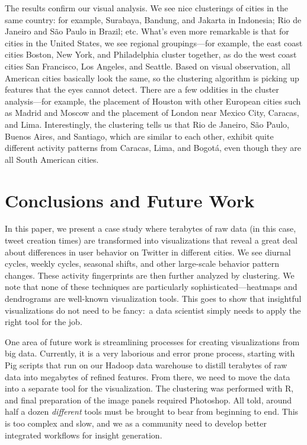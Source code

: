\documentclass[letterpaper]{article}
\begin{document}
The results confirm our visual analysis. We see nice clusterings of
cities in the same country: for example, Surabaya, Bandung, and
Jakarta in Indonesia; Rio de Janeiro and S\~{a}o Paulo in Brazil;
etc. What's even more remarkable is that for cities in the United
States, we see regional groupings---for example, the east coast cities
Boston, New York, and Philadelphia cluster together, as do the west
coast cities San Francisco, Los Angeles, and Seattle. Based on visual
observation, all American cities basically look the same, so the
clustering algorithm is picking up features that the eyes cannot detect.
There are a few oddities in the cluster analysis---for example, the
placement of Houston with other European cities such as Madrid and Moscow and the placement of
London near Mexico City, Caracas, and Lima. 
Interestingly, the clustering tells us that
Rio de Janeiro, S\~{a}o Paulo, Buenos Aires, and Santiago, which
are similar to each other, exhibit quite different activity patterns
from Caracas, Lima, and Bogot\'{a}, even though they are all South American cities.

\section{Conclusions and Future Work}

In this paper, we present a case study where terabytes of raw data (in
this case, tweet creation times) are transformed into visualizations
that reveal a great deal about differences in user behavior on Twitter
in different cities. We see diurnal cycles, weekly cycles, seasonal
shifts, and other large-scale behavior pattern changes. These activity
fingerprints are then further analyzed by clustering. We note that none
of these techniques are particularly sophisticated---heatmaps and
dendrograms are well-known visualization tools.
This goes to show that insightful visualizations do not need to be fancy:\ a data
scientist simply needs to apply the right tool for the job.

One area of future work is streamlining processes for creating
visualizations from big data. Currently, it is a very laborious and error prone
process, starting with Pig scripts that run on our Hadoop data
warehouse to distill terabytes of raw data into megabytes of refined
features. From there, we need to move the data into a separate tool
for the visualization. The clustering was performed with R, and final
preparation of the image panels required Photoshop. All told, around
half a dozen {\it different} tools must be brought to bear from
beginning to end. This is too complex and slow, and we as a community
need to develop better integrated workflows for insight generation.

 
\small

\end{document}
